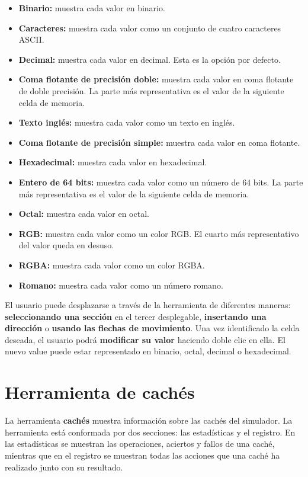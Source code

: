 \begin{itemize}
    \item \textbf{Binario:} muestra cada valor en binario.
    \item \textbf{Caracteres:} muestra cada valor como un conjunto de
    cuatro caracteres ASCII\@.
    \item \textbf{Decimal:} muestra cada valor en decimal.
    Esta es la opción por defecto.
    \item \textbf{Coma flotante de precisión doble:}  muestra cada valor
    en coma flotante de doble precisión.
    La parte más representativa es el valor de la siguiente celda de memoria.
    \item \textbf{Texto inglés:} muestra cada valor como un texto en inglés.
    \item \textbf{Coma flotante de precisión simple:} muestra cada
    valor en coma flotante.
    \item \textbf{Hexadecimal:} muestra cada valor en hexadecimal.
    \item \textbf{Entero de 64 bits:} muestra cada valor como un número de 64 bits.
    La parte más representativa es el valor de la siguiente celda de memoria.
    \item \textbf{Octal:} muestra cada valor en octal.
    \item \textbf{RGB:} muestra cada valor como un color RGB\@.
    El cuarto más representativo del valor queda en desuso.
    \item \textbf{RGBA:} muestra cada valor como un color RGBA\@.
    \item \textbf{Romano:} muestra cada valor como un número romano.
\end{itemize}

El usuario puede desplazarse a través de la herramienta
de diferentes maneras: \textbf{seleccionando una sección}
en el tercer desplegable, \textbf{insertando una dirección}
o \textbf{usando las flechas de movimiento}.
Una vez identificado la celda deseada, el usuario podrá
\textbf{modificar su valor} haciendo doble clic en ella.
El nuevo value puede estar representado en binario, octal,
decimal o hexadecimal.


\section{Herramienta de cachés}\label{sec:herramienta-de-caches}

La herramienta \textbf{cachés} muestra información
sobre las cachés del simulador.
La herramienta está conformada por dos secciones:
las estadísticas y el registro.
En las estadísticas se muestran las operaciones,
aciertos y fallos de una caché, mientras que en el
registro se muestran todas las acciones que una
caché ha realizado junto con su resultado.

